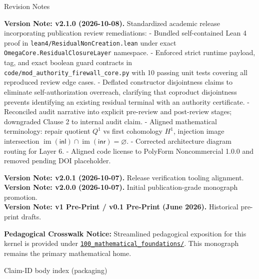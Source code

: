 \documentclass[
  10pt,
]{article}
\renewenvironment{quote}
  {\begin{leftbar}\small}
  {\end{leftbar}}
\DeclareRobustCommand{\texttt}[1]{{\paperSymbolFont\nolinkurl{#1}}}
\begin{document}
Revision Notes

\textbf{Version Note: v2.1.0 (2026-10-08).} Standardized academic release incorporating publication review remediations: - Bundled self-contained Lean 4 proof in \texttt{lean4/ResidualNonCreation.lean} under exact \texttt{OmegaCore.ResidualClosureLayer} namespace. - Enforced strict runtime payload, tag, and exact boolean guard contracts in \texttt{code/mod\_authority\_firewall\_core.py} with 10 passing unit tests covering all reproduced review edge cases. - Deflated constructor disjointness claims to eliminate self-authorization overreach, clarifying that coproduct disjointness prevents identifying an existing residual terminal with an authority certificate. - Reconciled audit narrative into explicit pre-review and post-review stages; downgraded Clause 2 to internal audit claim. - Aligned mathematical terminology: repair quotient \protect\hypertarget{math-E0006-0174}{}{\(Q^1\)} vs first cohomology \protect\hypertarget{math-E0104-0175}{}{\(H^1\)}, injection image intersection \protect\hypertarget{math-E0046-0176}{}{\(\operatorname{im}(\mathsf{inl}) \cap \operatorname{im}(\mathsf{inr}) = \varnothing\)}. - Corrected architecture diagram routing for Layer 6. - Aligned code license to PolyForm Noncommercial 1.0.0 and removed pending DOI placeholder.

\textbf{Version Note: v2.0.1 (2026-10-07).} Release verification tooling alignment.\\
\textbf{Version Note: v2.0.0 (2026-10-07).} Initial publication-grade monograph promotion.\\
\textbf{Version Note: v1 Pre-Print / v0.1 Pre-Print (June 2026).} Historical pre-print drafts.

\begin{quote}
\textbf{Pedagogical Crosswalk Notice:} Streamlined pedagogical exposition for this kernel is provided under \href{../100_mathematical_foundations/}{\texttt{100\_mathematical\_foundations/}}. This monograph remains the primary mathematical home.
\end{quote}

Claim-ID body index (packaging)
\end{document}

